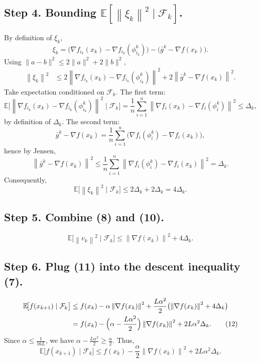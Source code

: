 \documentclass{article}
\newcommand{\EE}{\mathbb{E}}
\newcommand{\norm}[1]{\left\|#1\right\|}
\begin{document}
\subsection*{Step 4. Bounding $\EE[\norm{\xi_k}^{2}\mid\mathcal{F}_k]$.}
By definition of $\xi_k$,
\[
\xi_k = \bigl(\nabla f_{i_k}(x_k)-\nabla f_{i_k}(\phi_{i_k}^{k})\bigr)
        -\bigl(\bar g^{k}-\nabla f(x_k)\bigr).
\]
Using $\|a-b\|^{2}\le 2\|a\|^{2}+2\|b\|^{2}$,
\begin{align}
\norm{\xi_k}^{2}
 &\le 2\norm{\nabla f_{i_k}(x_k)-\nabla f_{i_k}(\phi_{i_k}^{k})}^{2}
      +2\norm{\bar g^{k}-\nabla f(x_k)}^{2}.
 \tag{9}
\end{align}
Take expectation conditioned on $\mathcal{F}_k$.
The first term:
\[
\EE\!\bigl[\norm{\nabla f_{i_k}(x_k)-\nabla f_{i_k}(\phi_{i_k}^{k})}^{2}
          \mid\mathcal{F}_k\bigr]
   =\frac{1}{n}\sum_{i=1}^{n}
      \norm{\nabla f_i(x_k)-\nabla f_i(\phi_i^{k})}^{2}
   \le \Delta_k,
\]
by definition of $\Delta_k$.
The second term:
\[
\bar g^{k} -\nabla f(x_k)
   =\frac{1}{n}\sum_{i=1}^{n}
      \bigl(\nabla f_i(\phi_i^{k})-\nabla f_i(x_k)\bigr),
\]
hence by Jensen,
\[
\norm{\bar g^{k}-\nabla f(x_k)}^{2}
   \le \frac{1}{n}\sum_{i=1}^{n}
      \norm{\nabla f_i(\phi_i^{k})-\nabla f_i(x_k)}^{2}
   =\Delta_k.
\]
Consequently,
\[
\EE\!\bigl[\norm{\xi_k}^{2}\mid\mathcal{F}_k\bigr]
   \le 2\Delta_k+2\Delta_k =4\Delta_k.
\tag{10}
\]

\subsection*{Step 5. Combine (8) and (10).}
\[
\EE\!\bigl[\norm{v_k}^{2}\mid\mathcal{F}_k\bigr]
   \le \norm{\nabla f(x_k)}^{2}+4\Delta_k.
\tag{11}
\]

\subsection*{Step 6. Plug (11) into the descent inequality (7).}
\begin{align}
\EE\!\bigl[f(x_{k+1})\mid\mathcal{F}_k\bigr]
 &\le f(x_k)-\alpha\norm{\nabla f(x_k)}^{2}
    +\frac{L\alpha^{2}}{2}
      \bigl(\norm{\nabla f(x_k)}^{2}+4\Delta_k\bigr)   \nonumber\\
 &=
    f(x_k)-\Bigl(\alpha-\frac{L\alpha^{2}}{2}\Bigr)\norm{\nabla f(x_k)}^{2}
    +2L\alpha^{2}\Delta_k .
 \tag{12}
\end{align}
Since $\alpha\le \frac{1}{16L}$, we have
$\alpha-\frac{L\alpha^{2}}{2}\ge \frac{\alpha}{2}$.
Thus,
\[
\EE\!\bigl[f(x_{k+1})\mid\mathcal{F}_k\bigr]
 \le f(x_k)-\frac{\alpha}{2}\norm{\nabla f(x_k)}^{2}
      +2L\alpha^{2}\Delta_k .
 \tag{13}
\]
\end{document}

